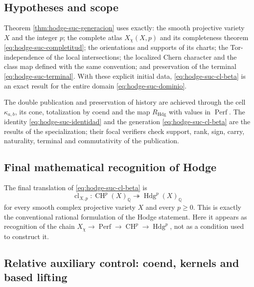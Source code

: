 \subsection*{Hypotheses and scope}

Theorem \ref{thm:hodge-suc-generacion} uses exactly: the smooth projective
variety \(X\) and the integer \(p\); the complete atlas
\(X_{\chi}(X,p)\) and its completeness theorem
\eqref{eq:hodge-suc-completitud}; the orientations and supports of its charts; the
Tor-independence of the local intersections; the localized Chern character and
the class map defined with the same convention; and preservation of the
terminal \eqref{eq:hodge-suc-terminal}. With these explicit initial
data, \eqref{eq:hodge-suc-cl-beta} is an exact result for the entire
domain \eqref{eq:hodge-suc-dominio}.

The double publication and preservation of history are achieved through the
cell \(\kappa_{a,b}\), its cone, totalization by coend and the map
\(R_{\mathrm{Hdg}}\) with values in \(\operatorname{Perf}\). The identity
\eqref{eq:hodge-suc-identidad} and the generation
\eqref{eq:hodge-suc-cl-beta} are the results of the specialization; their
focal verifiers check support, rank, sign, carry, naturality,
terminal and commutativity of the publication.

\subsection{Final mathematical recognition of Hodge}

The final translation of \eqref{eq:hodge-suc-cl-beta} is
\begin{equation}\label{eq:hodge-suc-reconocimiento-final}
 \operatorname{cl}_{X,p}:
 \operatorname{CH}^{p}(X)_{\mathbb Q}
 \twoheadrightarrow
 \operatorname{Hdg}^{p}(X)_{\mathbb Q}
\end{equation}
for every smooth complex projective variety \(X\) and every \(p\geq0\). This
is exactly the conventional rational formulation of the Hodge
statement. Here it appears as recognition of the chain
\(X_{\chi}\to\operatorname{Perf}\to\operatorname{CH}^{p}\to
\operatorname{Hdg}^{p}\), not as a condition used to construct it.

\subsection{Relative auxiliary control: coend, kernels and based lifting}
\label{subsec:amp-hodge-presentacion-relativa}

